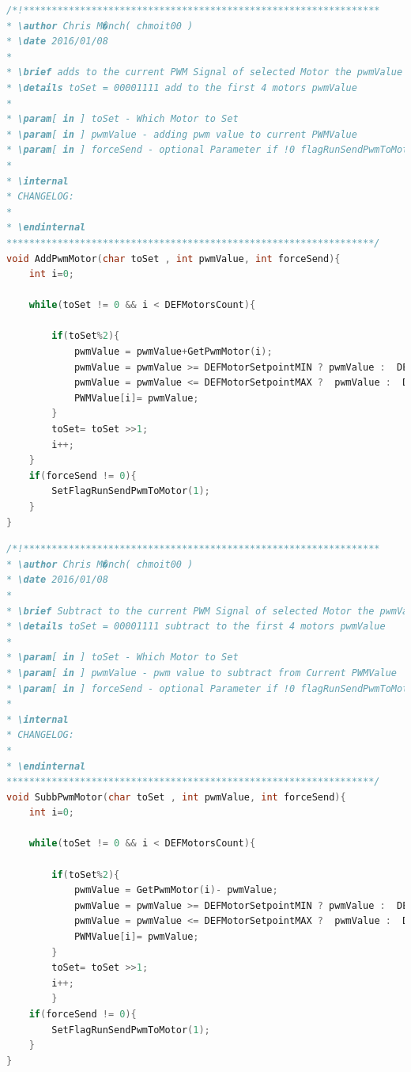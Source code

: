 \begin{lstlisting}[language=C++,firstnumber=96]
/*!***************************************************************
* \author Chris M�nch( chmoit00 )
* \date 2016/01/08
*
* \brief adds to the current PWM Signal of selected Motor the pwmValue
* \details toSet = 00001111 add to the first 4 motors pwmValue
*
* \param[ in ] toSet - Which Motor to Set
* \param[ in ] pwmValue - adding pwm value to current PWMValue
* \param[ in ] forceSend - optional Parameter if !0 flagRunSendPwmToMotor will be set
*
* \internal
* CHANGELOG:
*
* \endinternal
*****************************************************************/
void AddPwmMotor(char toSet , int pwmValue, int forceSend){
	int i=0;
	
	while(toSet != 0 && i < DEFMotorsCount){
	
		if(toSet%2){
			pwmValue = pwmValue+GetPwmMotor(i);
			pwmValue = pwmValue >= DEFMotorSetpointMIN ? pwmValue :  DEFMotorSetpointMIN;
			pwmValue = pwmValue <= DEFMotorSetpointMAX ?  pwmValue :  DEFMotorSetpointMAX;
			PWMValue[i]= pwmValue;
		}
		toSet= toSet >>1;
		i++;
	}
	if(forceSend != 0){
		SetFlagRunSendPwmToMotor(1);
	}
}

\end{lstlisting}

\begin{lstlisting}[language=C++,firstnumber=131]
/*!***************************************************************
* \author Chris M�nch( chmoit00 )
* \date 2016/01/08
*
* \brief Subtract to the current PWM Signal of selected Motor the pwmValue
* \details toSet = 00001111 subtract to the first 4 motors pwmValue
*
* \param[ in ] toSet - Which Motor to Set
* \param[ in ] pwmValue - pwm value to subtract from Current PWMValue
* \param[ in ] forceSend - optional Parameter if !0 flagRunSendPwmToMotor will be set
*
* \internal
* CHANGELOG:
*
* \endinternal
*****************************************************************/
void SubbPwmMotor(char toSet , int pwmValue, int forceSend){
	int i=0;
	
	while(toSet != 0 && i < DEFMotorsCount){
	
		if(toSet%2){
			pwmValue = GetPwmMotor(i)- pwmValue;
			pwmValue = pwmValue >= DEFMotorSetpointMIN ? pwmValue :  DEFMotorSetpointMIN;
			pwmValue = pwmValue <= DEFMotorSetpointMAX ?  pwmValue :  DEFMotorSetpointMAX;
			PWMValue[i]= pwmValue;
		}
		toSet= toSet >>1;
		i++;
		}
	if(forceSend != 0){
		SetFlagRunSendPwmToMotor(1);
	}
}
\end{lstlisting}

